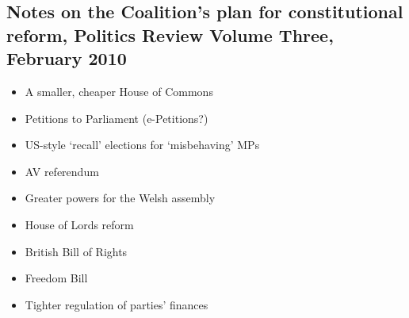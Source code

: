 \documentclass[12pt]{article}
\begin{document}
	\subsection*{Notes on the Coalition's plan for constitutional reform, Politics Review Volume Three, February 2010}

	\begin{itemize}
		\item{A smaller, cheaper House of Commons}
		\item{Petitions to Parliament (e-Petitions?)}
		\item{US-style `recall' elections for `misbehaving' MPs}
		\item{AV referendum}
		\item{Greater powers for the Welsh assembly}
		\item{House of Lords reform}
		\item{British Bill of Rights}
		\item{Freedom Bill}
		\item{Tighter regulation of parties' finances}
	\end{itemize}
\end{document}
